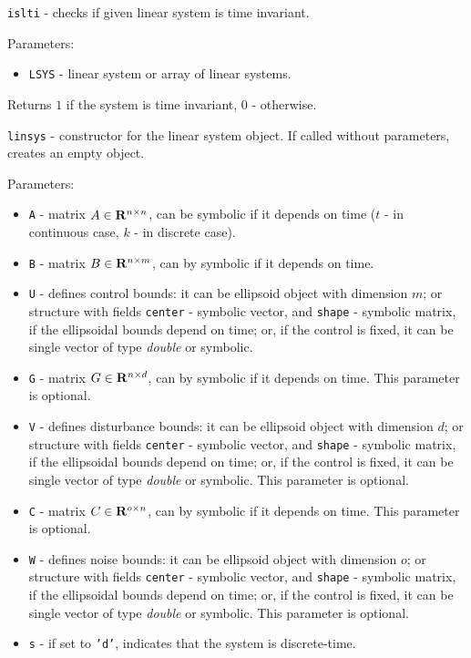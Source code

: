 {\Large {\tt islti}} - checks if given linear system is time invariant.

Parameters:
\begin{itemize}
\item {\tt LSYS} - linear system or array of linear systems.
\end{itemize}

Returns $1$ if the system is time invariant, $0$ - otherwise.

\newpage

{\Large {\tt linsys}} - constructor for the linear system object.
If called without parameters, creates an empty object.

Parameters:
\begin{itemize}
\item {\tt A} - matrix $A\in{\bf R}^{n\times n}$, can be symbolic if it
depends on time ($t$ - in continuous case, $k$ - in discrete case).
\item {\tt B} - matrix $B\in{\bf R}^{n\times m}$, can by symbolic if it
depends on time.
\item {\tt U} - defines control bounds: it can be ellipsoid object with
dimension $m$; or structure with fields {\tt center} - symbolic vector,
and {\tt shape} - symbolic matrix, if the ellipsoidal bounds depend on time;
or, if the control is fixed, it can be single vector of type {\it double}
or symbolic.
\item {\tt G} - matrix $G\in{\bf R}^{n\times d}$, can by symbolic if it
depends on time. This parameter is optional.
\item {\tt V} - defines disturbance bounds: it can be ellipsoid object with
dimension $d$; or structure with fields {\tt center} - symbolic vector,
and {\tt shape} - symbolic matrix, if the ellipsoidal bounds depend on time;
or, if the control is fixed, it can be single vector of type {\it double}
or symbolic. This parameter is optional.
\item {\tt C} - matrix $C\in{\bf R}^{o\times n}$, can by symbolic if it
depends on time. This parameter is optional.
\item {\tt W} - defines noise bounds: it can be ellipsoid object with
dimension $o$; or structure with fields {\tt center} - symbolic vector,
and {\tt shape} - symbolic matrix, if the ellipsoidal bounds depend on time;
or, if the control is fixed, it can be single vector of type {\it double}
or symbolic. This parameter is optional.
\item {\tt s} - if set to {\tt 'd'}, indicates that the system is discrete-time.
\end{itemize}

